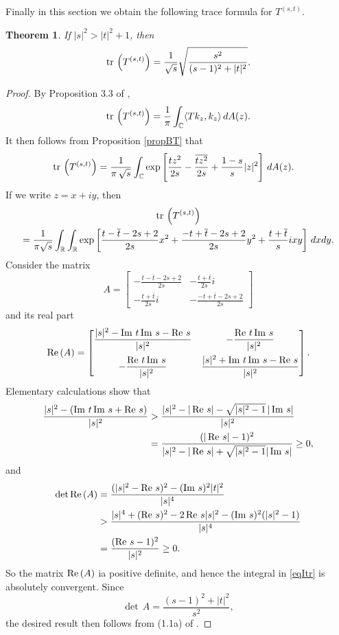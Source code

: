 \documentclass[reqno]{amsart}
\newtheorem{theorem}{Theorem}%
\newcommand{\R}{{\mathbb R}}
\newcommand{\C}{{\mathbb C}}
\newcommand{\inr}{\int_{\R}}
\newcommand{\inc}{\int_{\C}}
\DeclareMathOperator{\re}{{\rm Re}\,}
\DeclareMathOperator{\im}{{\rm Im}\,}
\DeclareMathOperator{\tr}{{\rm tr}\,}
\begin{document}
Finally in this section we obtain the following trace formula for $T^{(s,t)}$.

\begin{theorem}
If $|s|^2>|t|^2+1$, then
$$\tr\left(T^{(s,t)}\right)=
\frac{1}{\sqrt{s}}\sqrt{\frac{s^2}{(s-1)^2+|t|^2}}.$$
\end{theorem}

\begin{proof}
By Proposition 3.3 of \cite{Zhu1},
$$\tr\left(T^{(s,t)}\right)=\frac1{\pi}\inc\langle Tk_z, k_z\rangle\,dA(z).$$
It then follows from Proposition \ref{propBT} that
\begin{align*}
\tr\left(T^{(s,t)}\right)
&=\frac1{\pi\,\sqrt s}\inc\exp\left[\frac{tz^2}{2s}-\frac{\overline{tz^2}}{2s}
+\frac{1-s}s|z|^2\right]\,dA(z).
\end{align*}
If we write $z=x+iy$, then
\begin{multline}\label{eqItr}
\tr\left(T^{(s,t)}\right)\\
=\frac{1}{\pi\sqrt{s}}\inr\inr\exp\left[\frac{t-\overline{t}-2s+2}{2s}x^2+
\frac{-t+\overline{t}-2s+2}{2s}y^2+\frac{t+\overline{t}}{s}ixy\right]\,dxdy.
\end{multline}
Consider the matrix
$$A=\begin{bmatrix}\displaystyle -\frac{t-\overline{t}-2s+2}{2s} &
\displaystyle -\frac{t+\overline{t}}{2s}i\\[10pt]
\displaystyle -\frac{t+\overline{t}}{2s}i &
\displaystyle -\frac{-t+\overline{t}-2s+2}{2s}
\end{bmatrix}$$
and its real part
$$\re(A)=\begin{bmatrix}
\displaystyle\frac{|s|^2-\im t \im s-\re s}{|s|^2} &
\displaystyle -\frac{\re t\im s}{|s|^2}\\[10pt]
\displaystyle -\frac{\re t\im s}{|s|^2} &
\displaystyle\frac{|s|^2+\im t \im s-\re s}{|s|^2}
\end{bmatrix}.$$
Elementary calculations show that
\begin{align*}
\frac{|s|^2-(\im t \im s+\re s)}{|s|^2}
&>\frac{|s|^2-|\re s|-\sqrt{|s|^2-1} \, |\im s|}{|s|^2}\\
&=\frac{(|\re s|-1)^2}{|s|^2-|\re s|+\sqrt{|s|^2-1} |\im s|}\geq0,
\end{align*}
and
\begin{align*}
\det\re(A)&=\frac{(|s|^2-\re s)^2-(\im s)^2|t|^2}{|s|^4}\\
&>\frac{|s|^4+(\re s)^2-2\re s |s|^2-(\im s)^2(|s|^2-1)}{|s|^4}\\
&=\frac{(\re s-1)^2}{|s|^2}\geq0.
\end{align*}
So the matrix $\re (A)$ ia positive definite, and hence the integral
in \eqref{eqItr} is absolutely convergent. Since
$$\det\, A= \frac{(s-1)^2+|t|^2}{s^2},$$
the desired result then follows from (1.1a) of \cite{B1}.
\end{proof}
\end{document}
